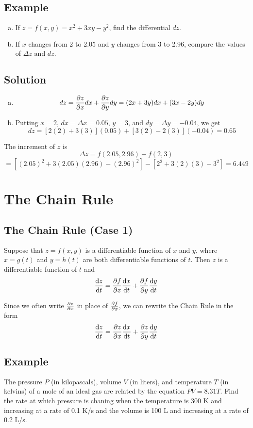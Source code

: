 \subsection*{Example}
\begin{enumerate}[(a)]
    \item If $z=f(x,y)=x^2+3xy-y^2$, find the differential $dz$.
    \item If $x$ changes from 2 to 2.05 and $y$ changes from 3 to 2.96, compare the values of $\Delta z$ and $dz$.
\end{enumerate}

\subsection*{Solution}
\begin{enumerate}[(a)]
    \item $$dz=\pdv{z}{x}dx+\pdv{z}{y}dy=(2x+3y)dx+(3x-2y)dy$$
    \item Putting $x=2$, $dx=\Delta x=0.05$, $y=3$, and $dy=\Delta y=-0.04$, we get
          $$dz=[2(2)+3(3)](0.05)+[3(2)-2(3)](-0.04)=0.65$$
\end{enumerate}
The increment of $z$ is
$$\Delta z=f(2.05,2.96)-f(2,3)$$
$$=[(2.05)^2+3(2.05)(2.96)-(2.96)^2]-[2^2+3(2)(3)-3^2]=6.449$$

\section{The Chain Rule}

\subsection*{The Chain Rule (Case 1)}
Suppose that $z = f(x, y)$ is a differentiable function of $x$ and $y$, where
$x = g(t)$ and $y = h(t)$ are both differentiable functions of $t$. Then
$z$ is a differentiable function of $t$ and
$$\dv{z}{t}=\pdv{f}{x}\dv{x}{t}+\pdv{f}{y}\dv{y}{t}$$

Since we often write $\pdv{z}{x}$ in place of $\pdv{f}{x}$, we can rewrite the Chain
Rule in the form
$$\dv{z}{t}=\pdv{z}{x}\dv{x}{t}+\pdv{z}{y}\dv{y}{t}$$

\subsection*{Example}
The pressure $P$ (in kilopascals), volume $V$ (in liters), and temperature $T$
(in kelvins) of a mole of an ideal gas are related by the equation $PV=8.31T$. Find
the rate at which pressure is chaning when the temperature is 300 K and increasing at
a rate of 0.1 K/s and the volume is 100 L and increasing at a rate of 0.2 L/s.

